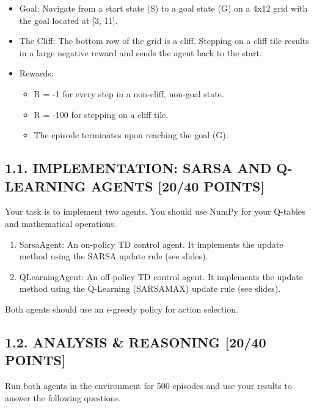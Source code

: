 \documentclass{article}
\begin{document}
\begin{itemize}
    \item Goal: Navigate from a start state (S) to a goal state (G) on a 4x12 grid with the goal located at [3, 11].
    \item The Cliff: The bottom row of the grid is a cliff. Stepping on a cliff tile results in a large negative reward and sends the agent back to the start.
    \item Rewards:
    \begin{itemize}
        \item R = -1 for every step in a non-cliff, non-goal state.
        \item R = -100 for stepping on a cliff tile.
        \item The episode terminates upon reaching the goal (G).
    \end{itemize}
\end{itemize}

\subsection{1.1. IMPLEMENTATION: SARSA AND Q-LEARNING AGENTS [20/40 POINTS]}

Your task is to implement two agents. You should use NumPy for your Q-tables and mathematical operations.

\begin{enumerate}[label=\Alph*.]
    \item SarsaAgent: An on-policy TD control agent. It implements the update method using the SARSA update rule (see slides).
    \item QLearningAgent: An off-policy TD control agent. It implements the update method using the Q-Learning (SARSAMAX) update rule (see slides).
\end{enumerate}

Both agents should use an $\epsilon$-greedy policy for action selection.


\subsection{1.2. ANALYSIS \& REASONING [20/40 POINTS]}

Run both agents in the environment for 500 episodes and use your results to answer the following questions.
\end{document}
